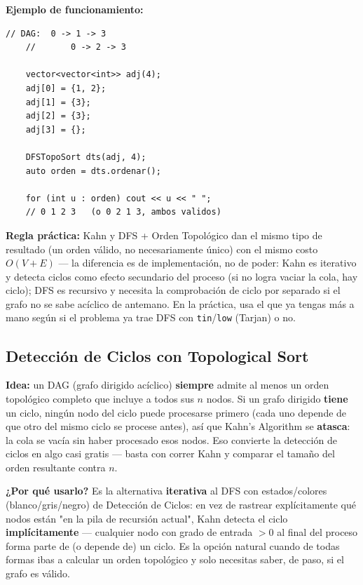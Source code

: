 \documentclass[10pt,a4paper,twocolumn]{article}
\begin{document}
\textbf{Ejemplo de funcionamiento:}

\begin{lstlisting}[style=cpp]
	// DAG:  0 -> 1 -> 3
	//       0 -> 2 -> 3
	
	vector<vector<int>> adj(4);
	adj[0] = {1, 2};
	adj[1] = {3};
	adj[2] = {3};
	adj[3] = {};
	
	DFSTopoSort dts(adj, 4);
	auto orden = dts.ordenar();
	
	for (int u : orden) cout << u << " ";
	// 0 1 2 3   (o 0 2 1 3, ambos validos)
\end{lstlisting}

\textbf{Regla práctica:} Kahn y DFS + Orden Topológico dan el mismo
tipo de resultado (un orden válido, no necesariamente único) con el
mismo costo $O(V+E)$ — la diferencia es de implementación, no de
poder: Kahn es iterativo y detecta ciclos como efecto secundario del
proceso (si no logra vaciar la cola, hay ciclo); DFS es recursivo y
necesita la comprobación de ciclo por separado si el grafo no se sabe
acíclico de antemano. En la práctica, usa el que ya tengas más a
mano según si el problema ya trae DFS con \texttt{tin}/\texttt{low}
(Tarjan) o no.

\subsection{Detección de Ciclos con Topological Sort}

\textbf{Idea:} un DAG (grafo dirigido acíclico) \textbf{siempre}
admite al menos un orden topológico completo que incluye a todos sus
$n$ nodos. Si un grafo dirigido \textbf{tiene} un ciclo, ningún nodo
del ciclo puede procesarse primero (cada uno depende de que otro del
mismo ciclo se procese antes), así que Kahn's Algorithm se
\textbf{atasca}: la cola se vacía sin haber procesado esos nodos. Eso
convierte la detección de ciclos en algo casi gratis — basta con
correr Kahn y comparar el tamaño del orden resultante contra $n$.

\textbf{¿Por qué usarlo?} Es la alternativa \textbf{iterativa} al DFS
con estados/colores (blanco/gris/negro) de Detección de Ciclos: en
vez de rastrear explícitamente qué nodos están "en la pila de
recursión actual", Kahn detecta el ciclo \textbf{implícitamente} —
cualquier nodo con grado de entrada $>0$ al final del proceso forma
parte de (o depende de) un ciclo. Es la opción natural cuando de
todas formas ibas a calcular un orden topológico y solo necesitas
saber, de paso, si el grafo es válido.
\end{document}
